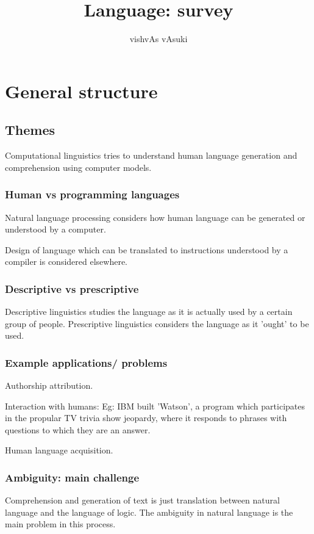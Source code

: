 \documentclass[oneside, article]{memoir}
\title{Language: survey}
\author{vishvAs vAsuki}
\begin{document}
\maketitle
\tableofcontents

\part{General structure}
\chapter{Themes}
Computational linguistics tries to understand human language generation and comprehension using computer models.

\section{Human vs programming languages}
Natural language processing considers how human language can be generated or understood by a computer.

Design of language which can be translated to instructions understood by a compiler is considered elsewhere.

\section{Descriptive vs prescriptive}
Descriptive linguistics studies the language as it is actually used by a certain group of people. Prescriptive linguistics considers the language as it 'ought' to be used.

\section{Example applications/ problems}
Authorship attribution.

Interaction with humans: Eg: IBM built 'Watson', a program which participates in the propular TV trivia show jeopardy, where it responds to phrases with questions to which they are an answer.

Human language acquisition.

\section{Ambiguity: main challenge}
Comprehension and generation of text is just translation between natural language and the language of logic. The ambiguity in natural language is the main problem in this process.
\end{document}
